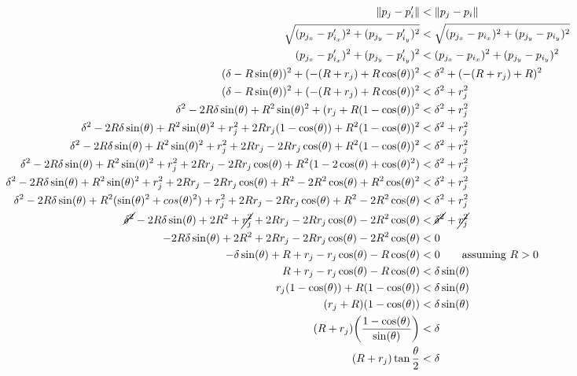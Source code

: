 \documentclass[conference]{IEEEtran}
\begin{document}
    \begin{align*}
      \lVert p_j - p'_i \rVert &< \lVert p_j - p_i \rVert \\
      \sqrt{(p_{j_x} - p'_{i_x})^2 + (p_{j_y} - p'_{i_y})^2} &< \sqrt{(p_{j_x} - p_{i_x})^2 + (p_{j_y} - p_{i_y})^2} \\
      (p_{j_x} - p'_{i_x})^2 + (p_{j_y} - p'_{i_y})^2 &< (p_{j_x} - p_{i_x})^2 + (p_{j_y} - p_{i_y})^2 \\
      (\delta - R\sin(\theta))^2 + (-(R+r_j) + R\cos(\theta))^2 &< \delta^2 + (-(R+r_j) + R)^2 \\
      (\delta - R\sin(\theta))^2 + (-(R+r_j) + R\cos(\theta))^2 &< \delta^2 + r_j^2 \\
      \delta^2 - 2R\delta\sin(\theta) + R^2\sin(\theta)^2 + (r_j + R(1 - \cos(\theta))^2 &< \delta^2 + r_j^2 \\
      \delta^2 - 2R\delta\sin(\theta) + R^2\sin(\theta)^2 + r_j^2 + 2Rr_j(1 - \cos(\theta)) + R^2(1 - \cos(\theta))^2 &< \delta^2 + r_j^2 \\
      \delta^2 - 2R\delta\sin(\theta) + R^2\sin(\theta)^2 + r_j^2 + 2Rr_j - 2Rr_j\cos(\theta) + R^2(1 - \cos(\theta))^2 &< \delta^2 + r_j^2 \\
      \delta^2 - 2R\delta\sin(\theta) + R^2\sin(\theta)^2 + r_j^2 + 2Rr_j - 2Rr_j\cos(\theta) + R^2(1 - 2\cos(\theta) + \cos(\theta)^2) &< \delta^2 + r_j^2 \\
      \delta^2 - 2R\delta\sin(\theta) + R^2\sin(\theta)^2 + r_j^2 + 2Rr_j - 2Rr_j\cos(\theta) + R^2 - 2R^2\cos(\theta) + R^2\cos(\theta)^2 &< \delta^2 + r_j^2 \\
      \delta^2 - 2R\delta\sin(\theta) + R^2(\sin(\theta)^2 + cos(\theta)^2) + r_j^2 + 2Rr_j - 2Rr_j\cos(\theta) + R^2 - 2R^2\cos(\theta) &< \delta^2 + r_j^2 \\
      \cancel{\delta^2} - 2R\delta\sin(\theta) + 2R^2 + \cancel{r_j^2} + 2Rr_j - 2Rr_j\cos(\theta) - 2R^2\cos(\theta) &< \cancel{\delta^2} + \cancel{r_j^2} \\
      -2R\delta\sin(\theta) + 2R^2 + 2Rr_j - 2Rr_j\cos(\theta) - 2R^2\cos(\theta) &< 0 \\
      -\delta\sin(\theta) + R + r_j - r_j\cos(\theta) - R\cos(\theta) &< 0 \qquad \text{assuming $R>0$}\\
      R + r_j - r_j\cos(\theta) - R\cos(\theta) &< \delta\sin(\theta) \\
      r_j(1 - \cos(\theta)) + R(1 - \cos(\theta)) &< \delta\sin(\theta) \\
      (r_j+R)(1 - \cos(\theta)) &< \delta\sin(\theta) \\
      (R+r_j)\bigg(\frac{1 - \cos(\theta)}{\sin(\theta)}\bigg) &< \delta \\
      (R+r_j)\tan{\frac{\theta}{2}}  &< \delta \\
    \end{align*}
\end{document}
